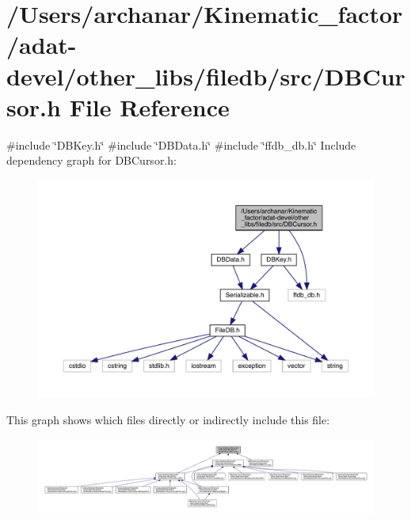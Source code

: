 \hypertarget{adat-devel_2other__libs_2filedb_2src_2DBCursor_8h}{}\section{/\+Users/archanar/\+Kinematic\+\_\+factor/adat-\/devel/other\+\_\+libs/filedb/src/\+D\+B\+Cursor.h File Reference}
\label{adat-devel_2other__libs_2filedb_2src_2DBCursor_8h}
{\ttfamily \#include \char`\"{}D\+B\+Key.\+h\char`\"{}}\newline
{\ttfamily \#include \char`\"{}D\+B\+Data.\+h\char`\"{}}\newline
{\ttfamily \#include \char`\"{}ffdb\+\_\+db.\+h\char`\"{}}\newline
Include dependency graph for D\+B\+Cursor.\+h\+:
\nopagebreak
\begin{figure}[H]
\begin{center}
\leavevmode
\includegraphics[width=350pt]{d8/d28/adat-devel_2other__libs_2filedb_2src_2DBCursor_8h__incl}
\end{center}
\end{figure}
This graph shows which files directly or indirectly include this file\+:
\nopagebreak
\begin{figure}[H]
\begin{center}
\leavevmode
\includegraphics[width=350pt]{d6/d78/adat-devel_2other__libs_2filedb_2src_2DBCursor_8h__dep__incl}
\end{center}
\end{figure}
